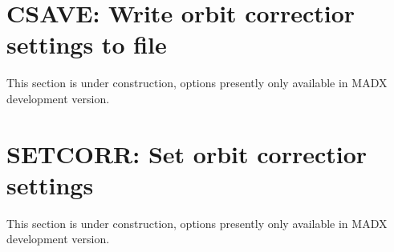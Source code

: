 


\section{CSAVE: Write orbit correctior settings to file}
\label{sec:csave}
 This section is under construction, options presently only available in
 MADX development version.  

\section{SETCORR: Set orbit correctior settings}
 This section is under construction, options presently only available in
 MADX development version.  


